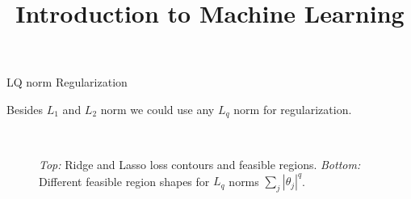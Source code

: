 \documentclass[11pt,compress,t,notes=noshow, xcolor=table]{beamer}
\title{Introduction to Machine Learning}
\date{}
\begin{document}

\begin{vbframe}{LQ norm Regularization} 

Besides $L_1$ and $L_2$ norm we could use any $L_q$ norm for regularization.

\begin{figure}
  \\
\caption{\textit{Top:} Ridge and Lasso loss contours and feasible regions.
  \textit{Bottom:} Different feasible region shapes for $L_q$ norms $\sum_j |\theta_j|^q$.}
\end{figure}
  
\end{vbframe}
\end{document}
